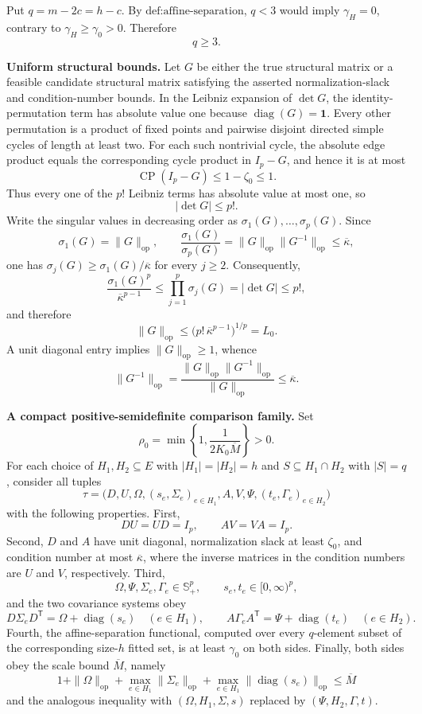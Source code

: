 Put \(q=m-2c=h-c\). By \(\text{def:affine-separation}\), \(q<3\) would imply \(\gamma_H=0\), contrary to \(\gamma_H\geq\gamma_0>0\). Therefore
\[
q\geq3.
\tag{1}
\]

\textbf{Uniform structural bounds.}
Let \(G\) be either the true structural matrix or a feasible candidate structural matrix satisfying the asserted normalization-slack and condition-number bounds. In the Leibniz expansion of \(\det G\), the identity-permutation term has absolute value one because \(\operatorname{diag}(G)=\mathbf 1\). Every other permutation is a product of fixed points and pairwise disjoint directed simple cycles of length at least two. For each such nontrivial cycle, the absolute edge product equals the corresponding cycle product in \(I_p-G\), and hence it is at most
\[
\operatorname{CP}(I_p-G)\leq1-\zeta_0\leq1.
\]
Thus every one of the \(p!\) Leibniz terms has absolute value at most one, so
\[
|\det G|\leq p!.
\tag{2}
\]
Write the singular values in decreasing order as \(\sigma_1(G),\ldots,\sigma_p(G)\). Since
\[
\sigma_1(G)=\|G\|_{\mathrm{op}},
\qquad
\frac{\sigma_1(G)}{\sigma_p(G)}
=\|G\|_{\mathrm{op}}\|G^{-1}\|_{\mathrm{op}}
\leq\overline\kappa,
\]
one has \(\sigma_j(G)\geq\sigma_1(G)/\overline\kappa\) for every \(j\geq2\). Consequently,
\[
\frac{\sigma_1(G)^p}{\overline\kappa^{p-1}}
\leq\prod_{j=1}^p\sigma_j(G)
=|\det G|
\leq p!,
\]
and therefore
\[
\|G\|_{\mathrm{op}}\leq
\bigl(p!\,\overline\kappa^{p-1}\bigr)^{1/p}=L_0.
\tag{3}
\]
A unit diagonal entry implies \(\|G\|_{\mathrm{op}}\geq1\), whence
\[
\|G^{-1}\|_{\mathrm{op}}
=\frac{\|G\|_{\mathrm{op}}\|G^{-1}\|_{\mathrm{op}}}
{\|G\|_{\mathrm{op}}}
\leq\overline\kappa.
\tag{4}
\]

\textbf{A compact positive-semidefinite comparison family.}
Set
\[
\rho_0=\min\left\{1,\frac{1}{2K_0\overline M}\right\}>0.
\tag{5}
\]
For each choice of \(H_1,H_2\subseteq E\) with \(|H_1|=|H_2|=h\) and \(S\subseteq H_1\cap H_2\) with \(|S|=q\), consider all tuples
\[
\tau=\bigl(D,U,\Omega,(s_e,\Sigma_e)_{e\in H_1},
A,V,\Psi,(t_e,\Gamma_e)_{e\in H_2}\bigr)
\]
with the following properties. First,
\[
DU=UD=I_p,
\qquad
AV=VA=I_p.
\tag{6}
\]
Second, \(D\) and \(A\) have unit diagonal, normalization slack at least \(\zeta_0\), and condition number at most \(\overline\kappa\), where the inverse matrices in the condition numbers are \(U\) and \(V\), respectively. Third,
\[
\Omega,\Psi,\Sigma_e,\Gamma_e\in\mathbb S_+^p,
\qquad
s_e,t_e\in[0,\infty)^p,
\tag{7}
\]
and the two covariance systems obey
\[
D\Sigma_eD^{\mathsf T}=\Omega+\operatorname{diag}(s_e)
\quad(e\in H_1),
\qquad
A\Gamma_eA^{\mathsf T}=\Psi+\operatorname{diag}(t_e)
\quad(e\in H_2).
\tag{8}
\]
Fourth, the affine-separation functional, computed over every \(q\)-element subset of the corresponding size-\(h\) fitted set, is at least \(\gamma_0\) on both sides. Finally, both sides obey the scale bound \(\overline M\), namely
\[
1+\|\Omega\|_{\mathrm{op}}
+\max_{e\in H_1}\|\Sigma_e\|_{\mathrm{op}}
+\max_{e\in H_1}\|\operatorname{diag}(s_e)\|_{\mathrm{op}}
\leq\overline M
\tag{9}
\]
and the analogous inequality with \((\Omega,H_1,\Sigma,s)\) replaced by \((\Psi,H_2,\Gamma,t)\).

